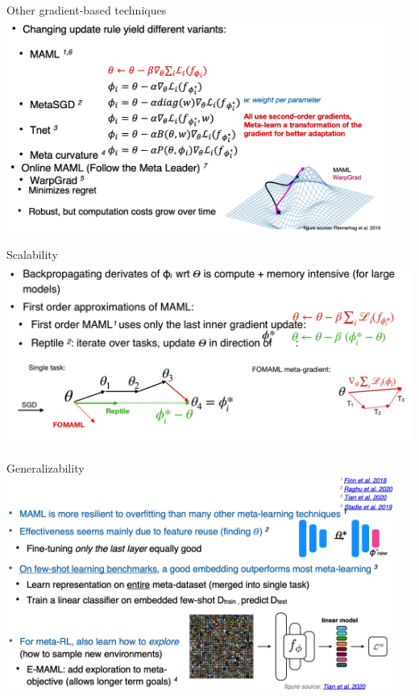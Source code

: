 \documentclass[aspectratio=169,t,handout,xcolor={usenames,dvipsnames}]{beamer}
\begin{document}
\begin{frame}{Other gradient-based techniques}
    \centering\includegraphics[height=7cm]{image/Jietu20220329-005754.jpg}
\end{frame}
\begin{frame}{Scalability}
    \centering\includegraphics[height=6cm]{image/Jietu20220329-010316.jpg}
\end{frame}
\begin{frame}{Generalizability}
    \centering\includegraphics[height=7cm]{image/Jietu20220329-010613.jpg}
\end{frame}
\end{document}
